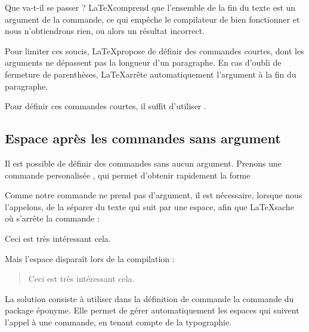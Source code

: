 Que va-t-il se passer ? \LaTeX comprend que l'ensemble de la fin du texte est un argument de la commande, ce qui empêche le compilateur de bien fonctionner  et nous n'obtiendrons rien, ou alors un résultat incorrect.

Pour limiter ces soucis, \LaTeX propose de définir des commandes courtes, dont les arguments ne dépassent pas la longueur d'un paragraphe. En cas d'oubli de fermeture de parenthèses, \LaTeX arrête automatiquement l'argument à la fin du paragraphe.

Pour définir ces commandes courtes, il suffit d'utiliser .

\begin{latexcode}
\newcommand*{\auteur}[1]{\textsc{#1}*}
\end{latexcode}

\subsection{Espace après les commandes sans argument}


Il est possible de définir des commandes sans aucun argument. Prenons une commande personalisée , qui permet d'obtenir rapidement la forme \forme{\cf}

\begin{latexcode}
\newcommand{\cf}[0]{\emph{cf.}}
\end{latexcode}

Comme notre commande ne prend pas d'argument, il est nécessaire, lorsque nous l'appelons, de la séparer du texte qui suit par une espace, afin que \LaTeX sache où s'arrête la commande : 

\begin{latexcode}
Ceci est très intéressant \cf cela.
\end{latexcode}

Mais  l'espace disparaît lors de la compilation :

\begin{quotation}
Ceci est très intéressant \cf cela.
\end{quotation}

La solution consiste à utiliser dans la définition de commande la commande  du package éponyme. Elle permet de gérer automatiquement les espaces qui suivent l'appel à une commande, en tenant compte de la typographie.

\begin{latexcode}
\newcommand{\cf}[0]{\emph{cf.}\xspace}
\end{latexcode}

